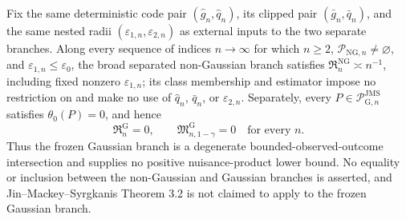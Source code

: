 Fix the same deterministic code pair \((\widehat g_n,\widehat q_n)\), its clipped pair \((\bar g_n,\bar q_n)\), and the same nested radii \((\varepsilon_{1,n},\varepsilon_{2,n})\) as external inputs to the two separate branches. Along every sequence of indices \(n\to\infty\) for which \(n\ge2\), \(\mathcal P_{\mathrm{NG},n}\neq\varnothing\), and \(\varepsilon_{1,n}\le\varepsilon_0\), the broad separated non-Gaussian branch satisfies \(\mathfrak R_n^{\mathrm{NG}}\asymp n^{-1}\), including fixed nonzero \(\varepsilon_{1,n}\); its class membership and estimator impose no restriction on and make no use of \(\widehat q_n\), \(\bar q_n\), or \(\varepsilon_{2,n}\). Separately, every \(P\in\mathcal P_{\mathrm G,n}^{\mathrm{JMS}}\) satisfies \(\theta_0(P)=0\), and hence
\[
 \mathfrak R_n^{\mathrm G}=0,
 \qquad
 \mathfrak M_{n,1-\gamma}^{\mathrm G}=0
 \quad\text{for every }n.
\]
Thus the frozen Gaussian branch is a degenerate bounded-observed-outcome intersection and supplies no positive nuisance-product lower bound. No equality or inclusion between the non-Gaussian and Gaussian branches is asserted, and Jin--Mackey--Syrgkanis Theorem 3.2 is not claimed to apply to the frozen Gaussian branch.